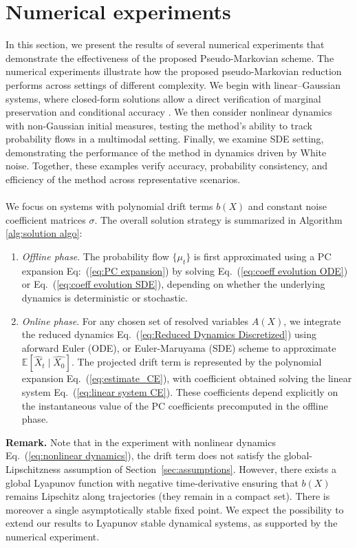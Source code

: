 \documentclass[11pt, a4paper, oneside, reqno]{amsart}
\begin{document}
\section{Numerical experiments}\label{sec:numerical experiments}
\noindent In this section, we present the results of several numerical experiments that demonstrate the effectiveness of the proposed Pseudo-Markovian scheme. The numerical experiments illustrate how the proposed pseudo-Markovian reduction performs across settings of different complexity. We begin with linear–Gaussian systems, where closed-form solutions allow a direct verification of marginal preservation and conditional accuracy . We then consider nonlinear dynamics with non-Gaussian initial measures, testing the method’s ability to track probability flows in a multimodal setting. Finally, we examine SDE setting, demonstrating the performance of the method in dynamics driven by White noise. Together, these examples verify accuracy, probability consistency, and efficiency of the method across representative scenarios. \\ \ \\
We focus on systems with polynomial drift terms $b(X)$ and constant noise coefficient matrices $\sigma$.
The overall solution strategy is summarized in Algorithm \ref{alg:solution algo}:
\begin{enumerate}
    \item \textit{Offline phase}. 
    The probability flow $\{\mu_t\}$ is first approximated using a PC expansion Eq:~(\ref{eq:PC expansion}) by solving Eq.~(\ref{eq:coeff evolution ODE}) or Eq.~(\ref{eq:coeff evolution SDE}), depending on whether the underlying dynamics is deterministic or stochastic.
    
    \item \textit{Online phase}. For any chosen set of resolved variables $A(X)$, we integrate the reduced dynamics Eq.~(\ref{eq:Reduced Dynamics Discretized}) using aforward Euler (ODE), or Euler-Maruyama (SDE) scheme to approximate $\mathbb{E}[\hat{X}_t\mid\hat{X_0}]$. 
    The projected drift term is represented by the polynomial expansion Eq.~(\ref{eq:estimate_CE}), with coefficient obtained solving the linear system Eq.~(\ref{eq:linear system CE}). These coefficients depend explicitly on the instantaneous value of the PC coefficients precomputed in the offline phase.
\end{enumerate}
\noindent\textbf{Remark.}
Note that in the experiment with nonlinear dynamics Eq.~(\ref{eq:nonlinear dynamics}), the drift term does not satisfy the global-Lipschitzness assumption of Section~\ref{sec:assumptions}. However, there exists a global Lyapunov function with negative time-derivative ensuring that $b(X)$ remains Lipschitz along trajectories (they remain in a compact set).
There is moreover a single asymptotically stable fixed point. We expect the possibility to extend our results to Lyapunov stable dynamical systems, as supported by the numerical experiment.
\end{document}
